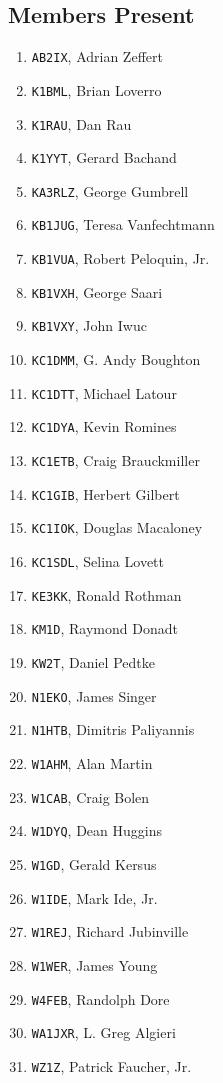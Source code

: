 \documentclass[10pt,letterpaper]{article}
\begin{document}
\subsection{Members Present}
\begin{enumerate}
\item \texttt{AB2IX}, Adrian Zeffert
\item \texttt{K1BML}, Brian Loverro
\item \texttt{K1RAU}, Dan Rau
\item \texttt{K1YYT}, Gerard Bachand
\item \texttt{KA3RLZ}, George Gumbrell
\item \texttt{KB1JUG}, Teresa Vanfechtmann
\item \texttt{KB1VUA}, Robert Peloquin, Jr.
\item \texttt{KB1VXH}, George Saari
\item \texttt{KB1VXY}, John Iwuc
\item \texttt{KC1DMM}, G. Andy Boughton
\item \texttt{KC1DTT}, Michael Latour
\item \texttt{KC1DYA}, Kevin Romines
\item \texttt{KC1ETB}, Craig Brauckmiller
\item \texttt{KC1GIB}, Herbert Gilbert
\item \texttt{KC1IOK}, Douglas Macaloney
\item \texttt{KC1SDL}, Selina Lovett
\item \texttt{KE3KK}, Ronald Rothman
\item \texttt{KM1D}, Raymond Donadt
\item \texttt{KW2T}, Daniel Pedtke
\item \texttt{N1EKO}, James Singer
\item \texttt{N1HTB}, Dimitris Paliyannis
\item \texttt{W1AHM}, Alan Martin
\item \texttt{W1CAB}, Craig Bolen
\item \texttt{W1DYQ}, Dean Huggins
\item \texttt{W1GD}, Gerald Kersus
\item \texttt{W1IDE}, Mark Ide, Jr.
\item \texttt{W1REJ}, Richard Jubinville
\item \texttt{W1WER}, James Young
\item \texttt{W4FEB}, Randolph Dore
\item \texttt{WA1JXR}, L. Greg Algieri
\item \texttt{WZ1Z}, Patrick Faucher, Jr.
\end{enumerate}
\end{document}
